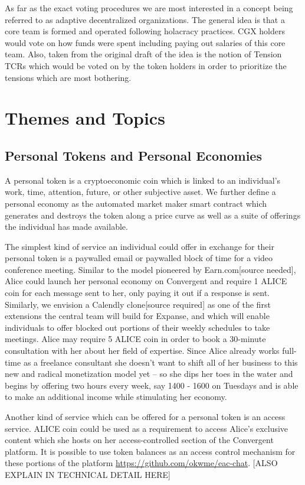\documentclass[a4paper]{article}
\begin{document}
As far as the exact voting procedures we are most interested in a concept being referred to as adaptive decentralized organizations. The general idea is that a core team is formed and operated following holacracy practices. CGX holders would vote on how funds were spent including paying out salaries of this core team. Also, taken from the original draft of the idea is the notion of Tension TCRs which would be voted on by the token holders in order to prioritize the tensions which are most bothering.

\section{Themes and Topics}

\subsection{Personal Tokens and Personal Economies}

A personal token is a cryptoeconomic coin which is linked to an individual’s work, time, attention, future, or other subjective asset. We further define a personal economy as the automated market maker smart contract which generates and destroys the token along a price curve as well as a suite of offerings the individual has made available. 

The simplest kind of service an individual could offer in exchange for their personal token is a paywalled email or paywalled block of time for a video conference meeting. Similar to the model pioneered by Earn.com[source needed], Alice could launch her personal economy on Convergent and require 1 ALICE coin for each message sent to her, only paying it out if a response is sent. Similarly, we envision a Calendly clone[source required] as one of the first extensions the central team will build for Expanse, and which will enable individuals to offer blocked out portions of their weekly schedules to take meetings. Alice may require 5 ALICE coin in order to book a 30-minute consultation with her about her field of expertise. Since Alice already works full-time as a freelance consultant she doesn’t want to shift all of her business to this new and radical monetization model yet -- so she dips her toes in the water and begins by offering two hours every week, say 1400 - 1600 on Tuesdays and is able to make an additional income while stimulating her economy.

Another kind of service which can be offered for a personal token is an access service. ALICE coin could be used as a requirement to access Alice’s exclusive content which she hosts on her access-controlled section of the Convergent platform. It is possible to use token balances as an access control mechanism for these portions of the platform \url{https://github.com/okwme/eac-chat}. [ALSO EXPLAIN IN TECHNICAL DETAIL HERE]
\end{document}
